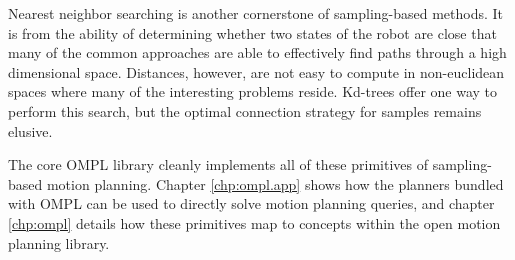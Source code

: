 Nearest neighbor searching is another cornerstone of sampling-based methods.
It is from the ability of determining whether two states of the robot are close
that many of the common approaches are able to effectively find paths through a
high dimensional space.  Distances, however, are not easy to compute in
non-euclidean spaces where many of the interesting problems reside.  Kd-trees
offer one way to perform this search, but the optimal connection strategy for
samples remains elusive.

The core OMPL library cleanly implements all of these primitives of
sampling-based motion planning.  Chapter \ref{chp:ompl.app} shows how the
planners bundled with OMPL can be used to directly solve motion planning
queries, and chapter \ref{chp:ompl} details how these primitives map to concepts
within the open motion planning library.

